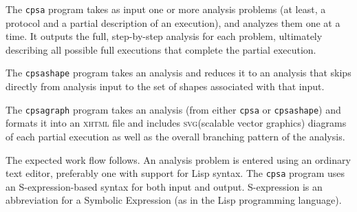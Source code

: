 The \texttt{cpsa} program takes as input one or more analysis problems
(at least, a protocol and a partial description of an execution), and
analyzes them one at a time.  It outputs the full, step-by-step
analysis for each problem, ultimately describing all possible full
executions that complete the partial execution.

The \texttt{cpsashape} program takes an analysis and reduces it to an
analysis that skips directly from analysis input to the set of shapes
associated with that input.

The \texttt{cpsagraph} program takes an analysis (from either
\texttt{cpsa} or \texttt{cpsashape}) and formats it into an
\textsc{xhtml} file and includes \textsc{svg}(scalable vector
graphics) diagrams of each partial execution as well as the overall
branching pattern of the analysis.


%

The expected work flow follows.  An analysis problem is entered using
an ordinary text editor, preferably one with support for Lisp syntax.
The \texttt{cpsa} program uses an S-expression-based syntax for both
input and output.  S-expression is an abbreviation for a Symbolic
Expression (as in the Lisp programming language).

